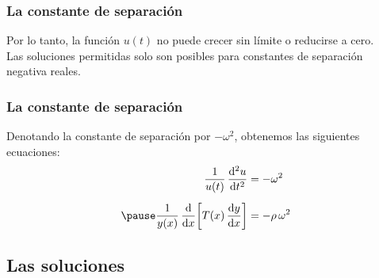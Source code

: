 \documentclass[12pt]{beamer}
\begin{document}
\begin{frame}
\frametitle{La constante de separación}
Por lo tanto, la función $u (t)$ no puede crecer sin límite o reducirse a cero.
\\
\bigskip
\pause
Las soluciones permitidas solo son posibles para constantes de separación negativa reales.
\end{frame}
\begin{frame}
\frametitle{La constante de separación}
Denotando la constante de separación por $- \omega^{2}$, obtenemos las siguientes ecuaciones:
\pause
\begin{eqnarray}
\begin{aligned}[b]
\dfrac{1}{u (t)} \, \dv[2]{u}{t} &= - \omega^{2} \label{eq:ecuacion_11} \\[0.5em] \pause
\dfrac{1}{y (x)} \, \dv{x} \bigg[ T (x) \, \dv{y}{x} \bigg] &= - \rho \, \omega^{2} \label{eq:ecuacion_12}
\end{aligned}
\end{eqnarray}
\end{frame}

\subsection{Las soluciones}
\end{document}
